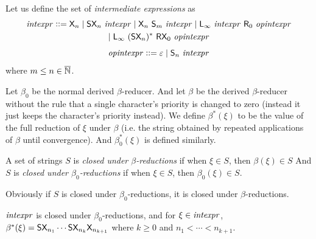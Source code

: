 \documentclass{llncs}
\begin{document}
Let us define the set of {\it intermediate expressions} as
\begin{multline*}
    {\it intexpr} \ccoloneqq \s X_n\gbar \s S\s X_n\ {\it intexpr} \gbar \s X_n\ \s S_m\ {\it intexpr}\gbar \s L_\infty\ {\it intexpr}\ \s R_0\ {\it opintexpr}\\
    \gbar \s L_\infty\ (\s S\s X_n)^*\ \s R\s X_0\ {\it opintexpr}
\end{multline*}
\[ {\it opintexpr} \mathrel{{\mathop:}{\mathop:}{=}} \varepsilon \mid \mathsf{S}_n\ {\it intexpr} \]
where $m\leq n\in\overline{\mathbb N}$.

Let $\beta_0$ be the normal derived $\beta$-reducer.
And let $\beta$ be the derived $\beta$-reducer without the rule that a single character's priority is changed to zero (instead it just keeps the character's priority instead).
We define $\beta^*(\xi)$ to be the value of the full reduction of $\xi$ under $\beta$ (i.e. the string obtained by repeated applications of $\beta$ until convergence).
And $\beta^*_0(\xi)$ is defined similarly.

\begin{definition}

    A set of strings $S$ is \emph{closed under $\beta$-reductions} if when $\xi\in S$, then $\beta(\xi)\in S$
    And $S$ is \emph{closed under $\beta_0$-reductions} if when $\xi\in S$, then $\beta_0(\xi)\in S$.

\end{definition}

Obviously if $S$ is closed under $\beta_0$-reductions, it is closed under $\beta$-reductions.

\begin{lemma}

    ${\it intexpr}$ is closed under $\beta_0$-reductions, and for $\xi\in{\it intexpr}$, $\beta^*(\xi)=\mathsf{S}\mathsf{X}_{n_1}\cdots\mathsf{S}\mathsf{X}_{n_k}\mathsf{X}_{n_{k+1}}$ where $k\geq0$ and $n_1<\cdots<n_{k+1}$.

\end{lemma}
\end{document}
